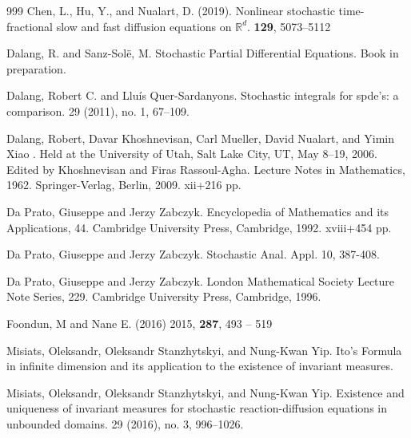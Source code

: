 \documentclass[a4paper,11pt]{article}
\numberwithin{equation}{section}
\theoremstyle{plain}
\theoremstyle{definition}
\newcommand{\R}{\mathbb{R}}
\numberwithin{NQ}{section}
\numberwithin{LQ}{section}
\numberwithin{ZQ}{section}
\begin{document}
\begin{thebibliography}{999}
	Chen, L., Hu, Y., and Nualart, D. (2019).
	\newblock Nonlinear stochastic time-fractional slow and fast diffusion equations on $\R^d$.
	 \textbf{129}, 5073--5112
	
	Dalang, R. and Sanz-Sol\"e, M.
	\newblock Stochastic Partial Differential Equations.
	\newblock Book in preparation. 
	
	
	Dalang, Robert C. and Llu\'is Quer-Sardanyons.
	\newblock Stochastic integrals for spde's: a comparison.
	 29 (2011), no. 1, 67--109.
	
	 Dalang, Robert, Davar Khoshnevisan, Carl
	Mueller, David Nualart, and Yimin Xiao
	.
	\newblock Held at the University of Utah, Salt Lake City, UT, May 8–19, 2006.
	Edited by  Khoshnevisan and Firas Rassoul-Agha. Lecture Notes in Mathematics,
	1962.
	\newblock Springer-Verlag, Berlin, 2009. xii+216 pp.
	
	Da Prato, Giuseppe and Jerzy Zabczyk.
	Encyclopedia of Mathematics and its Applications, 44. Cambridge University Press, Cambridge, 1992. xviii+454 pp.
	
	Da Prato, Giuseppe and Jerzy Zabczyk.
	Stochastic Anal. Appl. 10, 387-408.
	
	Da Prato, Giuseppe and Jerzy Zabczyk.
	\newblock London Mathematical Society Lecture Note Series, 229. Cambridge University Press, Cambridge, 1996.
	
	Foondun, M and Nane E. (2016)
	 2015, \textbf{287}, 493 -- 519
	
	Misiats, Oleksandr, Oleksandr Stanzhytskyi, and Nung-Kwan Yip.
	\newblock Ito's Formula in infinite dimension and its application to the existence of invariant measures.
	
	Misiats, Oleksandr, Oleksandr Stanzhytskyi, and Nung-Kwan Yip.
	\newblock Existence and uniqueness of invariant measures for stochastic reaction-diffusion equations in unbounded domains.
	 29 (2016), no. 3, 996--1026.
	

\end{thebibliography}
\end{document}
